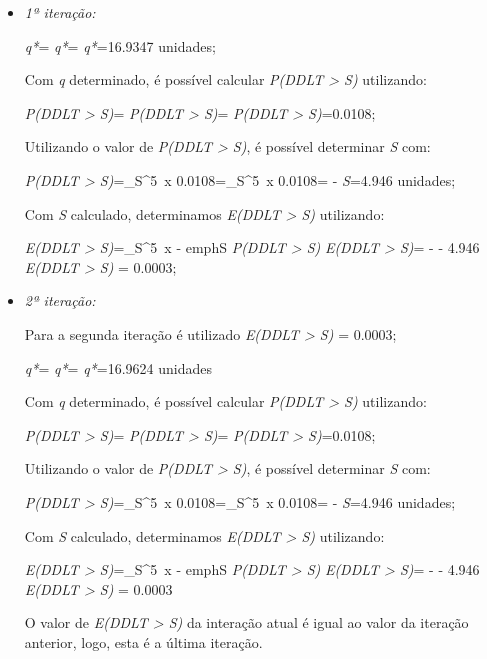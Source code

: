 \begin{itemize}
\item \emph{1ª iteração:}

	\emph{q*}=
	\emph{q*}=
	\emph{q*}=16.9347  unidades;

	Com \emph{q} determinado, é possível calcular \emph{P(DDLT > S)} utilizando:

	\emph{P(DDLT > S)}=
	\emph{P(DDLT > S)}=
	\emph{P(DDLT > S)}=0.0108;

	Utilizando o valor de \emph{P(DDLT > S)}, é possível determinar \emph{S} com:
	
	\emph{P(DDLT > S)}=\int_S^5 \,x
	0.0108=\int_S^5 \,x
	0.0108= - 
	\emph{S}=4.946 unidades;

	Com \emph{S} calculado, determinamos \emph{E(DDLT > S)} utilizando:
	
	\emph{E(DDLT > S)}=\int_S^5 \,x - emph{S} \times \emph{P(DDLT > S)}
	\emph{E(DDLT > S)}= -  - 4.946 
	\emph{E(DDLT > S)} = 0.0003;


\item \emph{2ª iteração:}
	
	Para a segunda iteração é utilizado \emph{E(DDLT > S)} = 0.0003;

	\emph{q*}=
	\emph{q*}=
	\emph{q*}=16.9624  unidades

	Com \emph{q} determinado, é possível calcular \emph{P(DDLT > S)} utilizando:

	\emph{P(DDLT > S)}=
	\emph{P(DDLT > S)}=
	\emph{P(DDLT > S)}=0.0108;

	Utilizando o valor de \emph{P(DDLT > S)}, é possível determinar \emph{S} com:
	
	\emph{P(DDLT > S)}=\int_S^5 \,x
	0.0108=\int_S^5 \,x
	0.0108= - 
	\emph{S}=4.946 unidades;

	Com \emph{S} calculado, determinamos \emph{E(DDLT > S)} utilizando:
	
	\emph{E(DDLT > S)}=\int_S^5 \,x - emph{S} \times \emph{P(DDLT > S)}
	\emph{E(DDLT > S)}= -  - 4.946 
	\emph{E(DDLT > S)} = 0.0003

	O valor de \emph{E(DDLT > S)} da interação atual é igual ao valor da iteração anterior, logo, esta é a última iteração.

\end{itemize}

